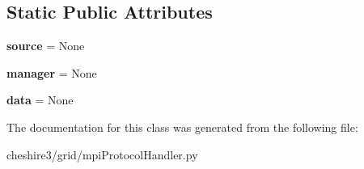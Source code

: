 \subsection*{Static Public Attributes}
\begin{DoxyCompactItemize}
\item 
\hypertarget{classcheshire3_1_1grid_1_1mpi_protocol_handler_1_1_message_a28c504dba9f4ebe2c37217d8073d03e4}{{\bfseries source} = None}\label{classcheshire3_1_1grid_1_1mpi_protocol_handler_1_1_message_a28c504dba9f4ebe2c37217d8073d03e4}

\item 
\hypertarget{classcheshire3_1_1grid_1_1mpi_protocol_handler_1_1_message_a53630fd5d75be9c3bbe3592fad578527}{{\bfseries manager} = None}\label{classcheshire3_1_1grid_1_1mpi_protocol_handler_1_1_message_a53630fd5d75be9c3bbe3592fad578527}

\item 
\hypertarget{classcheshire3_1_1grid_1_1mpi_protocol_handler_1_1_message_a934e41eded552a03493ed34de25a7dcd}{{\bfseries data} = None}\label{classcheshire3_1_1grid_1_1mpi_protocol_handler_1_1_message_a934e41eded552a03493ed34de25a7dcd}

\end{DoxyCompactItemize}


The documentation for this class was generated from the following file\-:\begin{DoxyCompactItemize}
\item 
cheshire3/grid/mpi\-Protocol\-Handler.\-py\end{DoxyCompactItemize}
